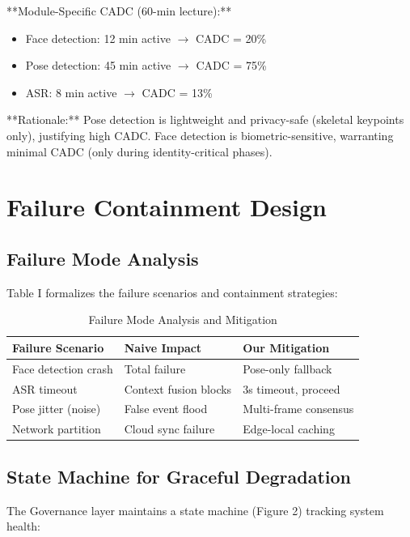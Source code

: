 \documentclass[conference]{IEEEtran}
\begin{document}
**Module-Specific CADC (60-min lecture):**
\begin{itemize}
    \item Face detection: 12 min active $\to$ CADC = 20\%
    \item Pose detection: 45 min active $\to$ CADC = 75\%
    \item ASR: 8 min active $\to$ CADC = 13\%
\end{itemize}

**Rationale:** Pose detection is lightweight and privacy-safe (skeletal keypoints only), justifying high CADC. Face detection is biometric-sensitive, warranting minimal CADC (only during identity-critical phases).

\section{Failure Containment Design}

\subsection{Failure Mode Analysis}
Table I formalizes the failure scenarios and containment strategies:

\begin{table}[htbp]
\caption{Failure Mode Analysis and Mitigation}
\begin{center}
\begin{tabular}{lll}
\toprule
\textbf{Failure Scenario} & \textbf{Naive Impact} & \textbf{Our Mitigation} \\
\midrule
Face detection crash & Total failure & Pose-only fallback \\
ASR timeout & Context fusion blocks & 3s timeout, proceed \\
Pose jitter (noise) & False event flood & Multi-frame consensus \\
Network partition & Cloud sync failure & Edge-local caching \\
\bottomrule
\end{tabular}
\end{center}
\end{table}

\subsection{State Machine for Graceful Degradation}
The Governance layer maintains a state machine (Figure 2) tracking system health:
\end{document}
